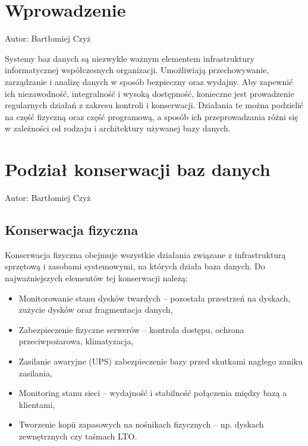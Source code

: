 \documentclass[a4paper,11pt,polish]{sphinxmanual}
\begin{document}
\section{Wprowadzenie}
\label{\detokenize{Kontrola_i_konserwacja/kontrola_i_konserwacja:wprowadzenie}}
\sphinxAtStartPar
Autor: Bartłomiej Czyż

\sphinxAtStartPar
Systemy baz danych są niezwykle ważnym elementem infrastruktury informatycznej współczesnych organizacji. Umożliwiają przechowywanie, zarządzanie i analizę danych w sposób bezpieczny oraz wydajny. Aby zapewnić ich niezawodność, integralność i wysoką dostępność, konieczne jest prowadzenie regularnych działań z zakresu kontroli i konserwacji. Działania te można podzielić na część fizyczną oraz część programową, a sposób ich przeprowadzania różni się w zależności od rodzaju i architektury używanej bazy danych.


\section{Podział konserwacji baz danych}
\label{\detokenize{Kontrola_i_konserwacja/kontrola_i_konserwacja:podzial-konserwacji-baz-danych}}
\sphinxAtStartPar
Autor: Bartłomiej Czyż


\subsection{Konserwacja fizyczna}
\label{\detokenize{Kontrola_i_konserwacja/kontrola_i_konserwacja:konserwacja-fizyczna}}
\sphinxAtStartPar
Konserwacja fizyczna obejmuje wszystkie działania związane z infrastrukturą sprzętową i zasobami systemowymi, na których działa baza danych. Do najważniejszych elementów tej konserwacji należą:
\begin{itemize}
\item {} 
\sphinxAtStartPar
Monitorowanie stanu dysków twardych – pozostała przestrzeń na dyskach, zużycie dysków oraz fragmentacja danych,

\item {} 
\sphinxAtStartPar
Zabezpieczenie fizyczne serwerów – kontrola dostępu, ochrona przeciwpożarowa, klimatyzacja,

\item {} 
\sphinxAtStartPar
Zasilanie awaryjne (UPS) \sphinxhyphen{} zabezpieczenie bazy przed skutkami nagłego zaniku zasilania,

\item {} 
\sphinxAtStartPar
Monitoring stanu sieci – wydajność i stabilność połączenia między bazą a klientami,

\item {} 
\sphinxAtStartPar
Tworzenie kopii zapasowych na nośnikach fizycznych – np. dyskach zewnętrznych czy taśmach LTO.

\end{itemize}
\end{document}
